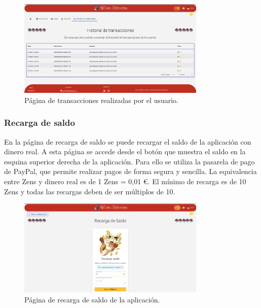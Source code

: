 \begin{figure}[H]
    \centering
    \includegraphics[width=0.8\textwidth]{figures/6-Analisis/6-Interfaz/interfaz/transacciones.png}
    \caption{Página de transacciones realizadas por el usuario.}
    \label{fig:m-interfaz-transacciones}
\end{figure}


\subsubsection{Recarga de saldo}
En la página de recarga de saldo se puede recargar el saldo de la aplicación con dinero real.
A esta página se accede desde el botón que muestra el saldo en la esquina superior derecha de la aplicación.
Para ello se utiliza la pasarela de pago de PayPal, que permite realizar pagos de forma segura y sencilla.
La equivalencia entre Zens y dinero real es de 1 Zens = 0,01 €.
El mínimo de recarga es de 10 Zens y todas las recargas deben de ser múltiplos de 10.

\begin{figure}[H]
    \centering
    \includegraphics[width=0.8\textwidth]{figures/6-Analisis/6-Interfaz/interfaz/recarga.png}
    \caption{Página de recarga de saldo de la aplicación.}
    \label{fig:m-interfaz-recarga}
\end{figure}

